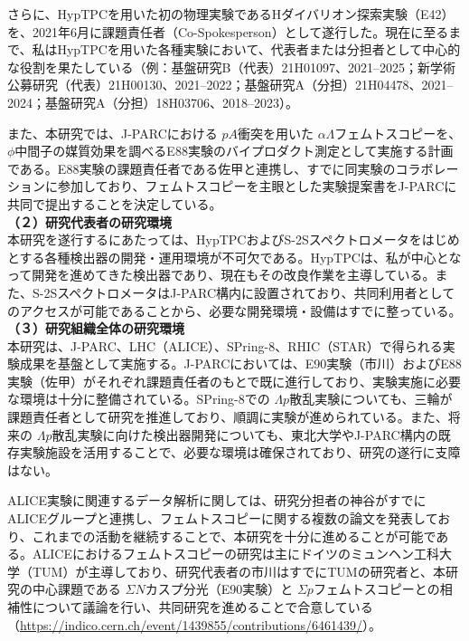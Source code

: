 	さらに、HypTPCを用いた初の物理実験であるHダイバリオン探索実験（E42）を、2021年6月に課題責任者（Co-Spokesperson）として遂行した。現在に至るまで、私はHypTPCを用いた各種実験において、代表者または分担者として中心的な役割を果たしている（例：基盤研究B（代表）21H01097、2021--2025；新学術公募研究（代表）21H00130、2021--2022；基盤研究A（分担）21H04478、2021--2024；基盤研究A（分担）18H03706、2018--2023）。

	また、本研究では、J-PARCにおける $pA$衝突を用いた $\alpha\Lambda$フェムトスコピーを、$\phi$中間子の媒質効果を調べるE88実験のバイプロダクト測定として実施する計画である。E88実験の課題責任者である佐甲と連携し、すでに同実験のコラボレーションに参加しており、フェムトスコピーを主眼とした実験提案書をJ-PARCに共同で提出することを決定している。
	\\

	\noindent
	\textbf{（２）研究代表者の研究環境}\\
	本研究を遂行するにあたっては、HypTPCおよびS-2Sスペクトロメータをはじめとする各種検出器の開発・運用環境が不可欠である。HypTPCは、私が中心となって開発を進めてきた検出器であり、現在もその改良作業を主導している。また、S-2SスペクトロメータはJ-PARC構内に設置されており、共同利用者としてのアクセスが可能であることから、必要な開発環境・設備はすでに整っている。
	\\

	\noindent
	\textbf{（３）研究組織全体の研究環境}\\
	本研究は、J-PARC、LHC（ALICE）、SPring-8、RHIC（STAR）で得られる実験成果を基盤として実施する。J-PARCにおいては、E90実験（市川）およびE88実験（佐甲）がそれぞれ課題責任者のもとで既に進行しており、実験実施に必要な環境は十分に整備されている。SPring-8での $\Lambda p$散乱実験についても、三輪が課題責任者として研究を推進しており、順調に実験が進められている。また、将来の $\Lambda p$散乱実験に向けた検出器開発についても、東北大学やJ-PARC構内の既存実験施設を活用することで、必要な環境は確保されており、研究の遂行に支障はない。

	ALICE実験に関連するデータ解析に関しては、研究分担者の神谷がすでにALICEグループと連携し、フェムトスコピーに関する複数の論文を発表しており、これまでの活動を継続することで、本研究を十分に進めることが可能である。ALICEにおけるフェムトスコピーの研究は主にドイツのミュンヘン工科大学（TUM）が主導しており、研究代表者の市川はすでにTUMの研究者と、本研究の中心課題である $\Sigma N$カスプ分光（E90実験）と $\Sigma p$フェムトスコピーとの相補性について議論を行い、共同研究を進めることで合意している（\url{https://indico.cern.ch/event/1439855/contributions/6461439/}）。

